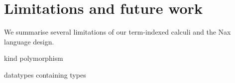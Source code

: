 
\section{Limitations and future work}\label{sec:concl:fw}
We summarise several limitations of our term-indexed calculi and
the Nax language design.

kind polymorphism

datatypes containing types
